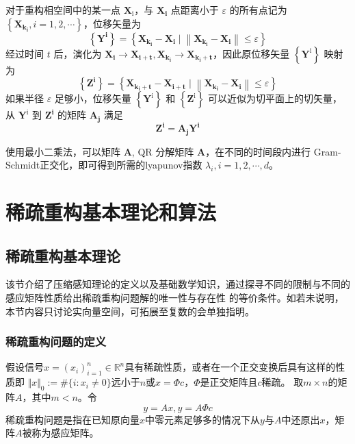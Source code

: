 对于重构相空间中的某一点 $\mathbf{X}_{\mathrm{i}}$，与 $\mathbf{X}_{\mathbf{i}}$ 点距离小于 $\varepsilon$ 的所有点记为 $\left\{\mathbf{X}_{\mathbf{k}_{\mathbf{i}}}, i=1,2, \cdots\right\}$，位移矢量为 
$$\left\{\mathbf{Y}^{\mathbf{i}}\right\}=\left\{\mathbf{X}_{\mathbf{k}_{\mathbf{i}}}-\mathbf{X}_{\mathbf{i}} \mid\left\|\mathbf{X}_{\mathbf{k}_{\mathbf{i}}}-\mathbf{X}_{\mathbf{i}}\right\| \leq \varepsilon\right\}$$
经过时间 $t$ 后，演化为 $\mathbf{X}_{\mathbf{i}} \rightarrow \mathbf{X}_{\mathbf{i + t}}, \mathbf{X}_{\mathbf{k}_{\mathbf{i}}} \rightarrow \mathbf{X}_{\mathbf{k}_{\mathbf{i}}+\mathbf{t}}$，因此原位移矢量 $\left\{\mathbf{Y}^{\mathrm{i}}\right\}$ 映射为
$$\left\{\mathbf{Z}^{\mathbf{i}}\right\}=\left\{\mathbf{X}_{\mathbf{k}_{\mathbf{i}}+\mathbf{t}}-\mathbf{X}_{\mathbf{i}+\mathbf{t}} \mid\left\|\mathbf{X}_{\mathbf{k}_{\mathbf{i}}}-\mathbf{X}_{\mathbf{i}}\right\| \leq \varepsilon\right\}$$
如果半径 $\varepsilon$ 足够小，位移矢量 $\left\{\mathbf{Y}^{\mathrm{i}}\right\}$ 和 $\left\{\mathbf{Z}^{\mathrm{i}}\right\}$ 可以近似为切平面上的切矢量，从 $\mathbf{Y}^{\mathrm{i}}$ 到 $\mathbf{Z}^{\mathbf{i}}$ 的矩阵 $\mathbf{A}_{\mathbf{j}}$ 满足
$$\mathbf{Z}^{\mathbf{i}}=\mathbf{A}_{\mathbf{j}} \mathbf{Y}^{\mathbf{i}}$$

使用最小二乘法，可以矩阵 $\mathbf{A}$, $\mathrm{QR}$ 分解矩阵 $\mathbf{A}$，在不同的时间段内进行 Gram-Schmidt正交化，即可得到所需的lyapunov指数 $\lambda_{i}, i=1,2, \cdots, d$。\par
\section{稀疏重构基本理论和算法}
\subsection{稀疏重构基本理论}
该节介绍了压缩感知理论的定义以及基础数学知识，通过探寻不同的限制与不同的感应矩阵性质给出稀疏重构问题解的唯一性与存在性
的等价条件。如若未说明，本节内容只讨论实向量空间，可拓展至复数的会单独指明。
\subsubsection{稀疏重构问题的定义}
假设信号$x=\left(x_i\right)^n_{i=1}\in \mathbb{R}^n$具有稀疏性质，或者在一个正交变换后具有这样的性质即
$\Vert x\Vert_0:=\# \{i:x_i \neq 0\}$远小于$n$或$x=\Phi c$，$\Phi$是正交矩阵且$c$稀疏。
取$m\times n$的矩阵$A$，其中$m<n$。令
\begin{equation}
    y=Ax,y=A\Phi c
\end{equation}
稀疏重构问题是指在已知原向量$x$中零元素足够多的情况下从$y$与$A$中还原出$x$，矩阵$A$被称为感应矩阵。

